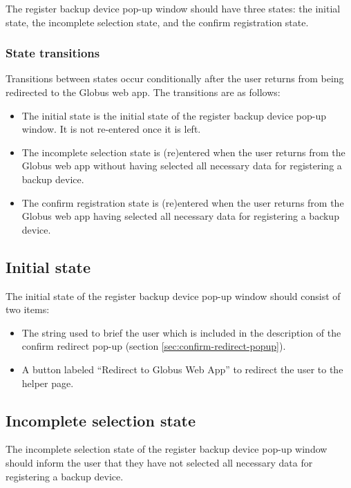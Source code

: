 The register backup device pop-up window should have three states: the initial state,
the incomplete selection state, and the confirm registration state. 

\subsubsection{State transitions}

Transitions between states occur conditionally after the user returns from being redirected 
to the Globus web app. The transitions are as follows:

\begin{itemize}
    \item The initial state is the initial state of the register backup device pop-up window. It
    is not re-entered once it is left.
    \item The incomplete selection state is (re)entered when the user returns from the Globus web app
    without having selected all necessary data for registering a backup device.
    \item The confirm registration state is (re)entered when the user returns from the Globus web app
    having selected all necessary data for registering a backup device.
\end{itemize}

\subsection{Initial state}

The initial state of the register backup device pop-up window should consist of two items:
\begin{itemize}
    \item The string used to brief the user which is included in the description of the confirm 
    redirect pop-up (section \ref{sec:confirm-redirect-popup}).
    \item A button labeled ``Redirect to Globus Web App'' to redirect the user to the helper page.
\end{itemize}

\subsection{Incomplete selection state}

The incomplete selection state of the register backup device pop-up window should inform 
the user that they have not selected all necessary data for registering a backup device.

